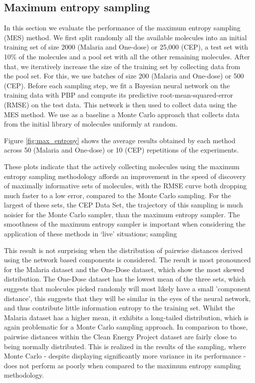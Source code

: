 \subsection{Maximum entropy sampling}

In this section we evaluate the performance of the maximum entropy sampling (MES) method. We first split randomly all the available molecules into an initial training set of size 2000 (Malaria and One-dose) or 25,000 (CEP), a test set with 10\% of the molecules and a pool set with all the other remaining molecules. After that, we iteratively increase the size of the training set by collecting data from the pool set. For this, we use batches of size 200 (Malaria and One-dose) or 500 (CEP). Before each sampling step, we fit a Bayesian neural network on the training data with PBP and compute its predictive root-mean-squared-error (RMSE) on the test data. This network is then used to collect data using the MES method. We use as a baseline a Monte Carlo approach that collects data from the initial library of molecules uniformly at random.

Figure \ref{fig:max_entropy} shows the average results obtained by each method across 50 (Malaria and One-dose) or 10 (CEP) repetitions of the experiments. 

These plots indicate that the actively collecting molecules using the maximum entropy sampling methodology affords an improvement in the speed of discovery of maximally informative sets of molecules, with the RMSE curve both dropping much faster to a low error, compared to the Monte Carlo sampling.  For the largest of these sets, the CEP Data Set, the trajectory of this sampling is much noisier for the Monte Carlo sampler, than the maximum entropy sampler.  The smoothness of the maximum entropy sampler is important when considering the application of these methods in `live' situations; sampling 

This result is not surprising when the distribution of pairwise distances derived using the network based components is considered. The result is most pronounced for the Malaria dataset and the One-Dose dataset, which show the most skewed distribution.  The One-Dose dataset has the lowest mean of the three sets, which suggests that molecules picked randomly will most likely have a small 'component distance', this suggests that they will be similar in the eyes of the neural network, and thus contribute little information entropy to the training set. Whilst the Malaria dataset has a higher mean, it exhibits a long-tailed distribution, which is again problematic for a Monte Carlo sampling approach.  In comparison to those, pairwise distances within the Clean Energy Project dataset are fairly close to being normally distributed.  This is realized in the results of the sampling, where Monte Carlo - despite displaying significantly more variance in its performance - does not perform as poorly when compared to the maximum entropy sampling methodology.

